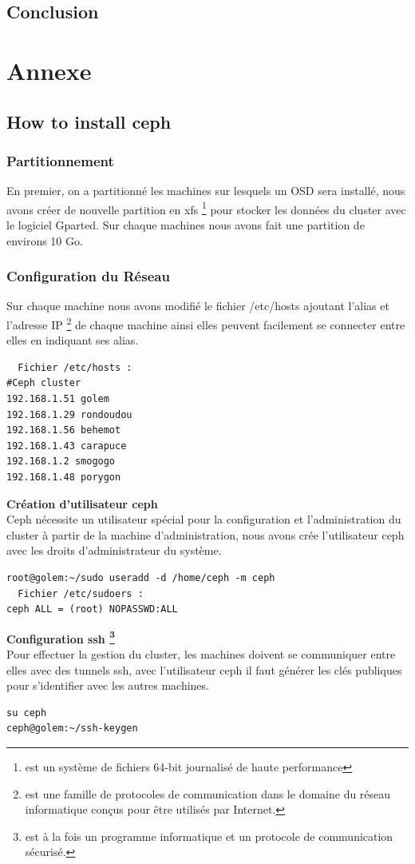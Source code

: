 \documentclass[12pt]{article}
\begin{document}
\subsection{Conclusion}


\section{Annexe}
 
  \subsection{How to install ceph}
	\subsubsection{Partitionnement}
	En premier, on a partitionné les machines sur lesquels un OSD sera installé, nous avons créer de nouvelle partition en xfs \footnote{est un système de fichiers 64-bit journalisé de haute performance} pour stocker les données du cluster avec le logiciel Gparted. Sur chaque machines nous avons fait une partition de environs 10 Go.
	\subsubsection{Configuration du Réseau }
	Sur chaque machine nous avons modifié le fichier /etc/hosts ajoutant l'alias et l'adresse IP \footnote{est une famille de protocoles de communication dans le domaine du réseau informatique conçus pour être utilisés par Internet.} de chaque machine ainsi elles peuvent facilement se connecter entre elles en indiquant ses alias.
	\begin{verbatim}
  Fichier /etc/hosts :
#Ceph cluster
192.168.1.51 golem
192.168.1.29 rondoudou
192.168.1.56 behemot
192.168.1.43 carapuce
192.168.1.2 smogogo
192.168.1.48 porygon
	\end{verbatim}

\textbf{ Création d'utilisateur ceph}
\\Ceph nécessite un utilisateur spécial pour la configuration et l'administration du cluster à partir de la machine d'administration, nous avons crée l'utilisateur ceph avec les droits d'administrateur du système.
\begin{verbatim}
root@golem:~/sudo useradd -d /home/ceph -m ceph
  Fichier /etc/sudoers :
ceph ALL = (root) NOPASSWD:ALL
\end{verbatim}

\textbf{Configuration ssh \footnote{est à la fois un programme informatique et un protocole de communication sécurisé.}}
\\Pour effectuer la gestion du cluster, les machines doivent se communiquer entre elles avec des tunnels ssh, avec l'utilisateur ceph il faut générer les clés publiques pour s'identifier avec les autres machines.
\begin{verbatim}
su ceph
ceph@golem:~/ssh-keygen
\end{verbatim}
\end{document}
